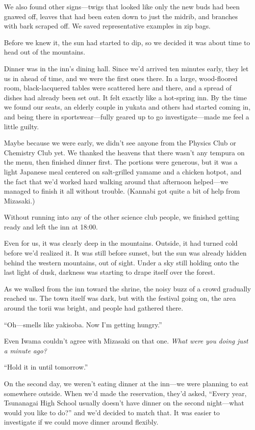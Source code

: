 \documentclass[
    a4paper,
    12pt,
    twoside,
    openany,
    UTF8,
    fontset=windows
]{ctexbook}
\begin{document}
We also found other signs---twigs that looked like only the new buds had been gnawed off, leaves that had been eaten down to just the midrib, and branches with bark scraped off. We saved representative examples in zip bags.

Before we knew it, the sun had started to dip, so we decided it was about time to head out of the mountains.

Dinner was in the inn's dining hall. Since we'd arrived ten minutes early, they let us in ahead of time, and we were the first ones there. In a large, wood-floored room, black-lacquered tables were scattered here and there, and a spread of dishes had already been set out. It felt exactly like a hot-spring inn. By the time we found our seats, an elderly couple in yukata and others had started coming in, and being there in sportswear---fully geared up to go investigate---made me feel a little guilty.

Maybe because we were early, we didn't see anyone from the Physics Club or Chemistry Club yet. We thanked the heavens that there wasn't any tempura on the menu, then finished dinner first. The portions were generous, but it was a light Japanese meal centered on salt-grilled yamame and a chicken hotpot, and the fact that we'd worked hard walking around that afternoon helped---we managed to finish it all without trouble. (Kannabi got quite a bit of help from Mizasaki.)

Without running into any of the other science club people, we finished getting ready and left the inn at 18:00.

Even for us, it was clearly deep in the mountains. Outside, it had turned cold before we'd realized it. It was still before sunset, but the sun was already hidden behind the western mountains, out of sight. Under a sky still holding onto the last light of dusk, darkness was starting to drape itself over the forest.

As we walked from the inn toward the shrine, the noisy buzz of a crowd gradually reached us. The town itself was dark, but with the festival going on, the area around the torii was bright, and people had gathered there.

``Oh---smells like yakisoba. Now I'm getting hungry.''

Even Iwama couldn't agree with Mizasaki on that one. \textit{What were you doing just a minute ago?}

``Hold it in until tomorrow.''

On the second day, we weren't eating dinner at the inn---we were planning to eat somewhere outside. When we'd made the reservation, they'd asked, ``Every year, Tsunanagai High School usually doesn't have dinner on the second night---what would you like to do?'' and we'd decided to match that. It was easier to investigate if we could move dinner around flexibly.
\end{document}
